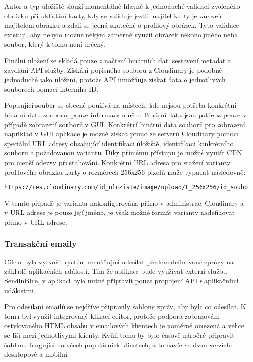 		Autor a typ úložiště slouží momentálně hlavně k jednoduché validaci zvoleného obrázku při ukládání karty, kdy
		se validuje jestli majitel karty je zároveň majitelem obrázku a zdali se jedná skutečně o profilový obrázek.
		Tyto validace existují, aby nebylo možné někým záměrně využít obrázek někoho jiného nebo soubor, který k tomu
		není určený.

		Finální uložení se skládá pouze z načtení binárních dat, sestavení metadat a zavolání \ac{API}
		služby.
		Získání popisného souboru z Cloudinary je podobně jednoduché jako uložení, protože
		\ac{API} umožňuje získat data o jednotlivých souborech pomocí interního ID.

		Popisující soubor se obecně používá na místech, kde nejsou potřeba konkrétní binární data souboru, pouze
		informace o něm.
		Binární data jsou potřeba pouze v případě zobrazení souborů v \ac{GUI}.
		Konkrétní binární data souborů pro zobrazení například v \ac{GUI} aplikace je možné získat přímo ze serverů
		Cloudinary pomocí speciální \ac{URL} adresy obsahující identifikaci úložiště, identifikaci konkrétního souboru a
		požadovanou variantu.
		Díky přímému přístupu je možné využít \ac{CDN} pro menší odezvy při stahování.
		Konkrétní \ac{URL} adresa pro stažení varianty profilového obrázku karty o rozměrech 256x256 pixelů může
		vypadat následovně:

		\begin{codeblock}
			\begin{verbatim}
https://res.cloudinary.com/id_uloziste/image/upload/t_256x256/id_souboru
			\end{verbatim}
		\end{codeblock}

		V tomto případě je varianta nakonfigurována přímo v administraci Cloudinary a v \ac{URL} adrese je pouze její jméno,
		je však možné formát varianty nadefinovat přímo v \ac{URL} adrese.

		\subsubsection{Transakční emaily}

		Cílem bylo vytvořit systém umožňující odesílat předem definované zprávy na základě aplikačních událostí.
		Tím že aplikace bude využívat externí službu SendinBlue, v aplikaci bylo nutné připravit pouze propojení
		\ac{API} s aplikačními událostmi.

		Pro odesílaní emailů se nejdříve připravily šablony zpráv, aby bylo co odesílat.
		K tomu byl využit integrovaný klikací editor, protože
		podpora zobrazování ostylovaného \ac{HTML} obsahu v
		emailových klientech je poměrně omezená a velice se liší mezi jednotlivými klienty.
		Kvůli tomu by bylo časově náročné připravit šablonu fungující na všech populárních klientech, a to navíc ve dvou
		verzích: desktopové a mobilní.

